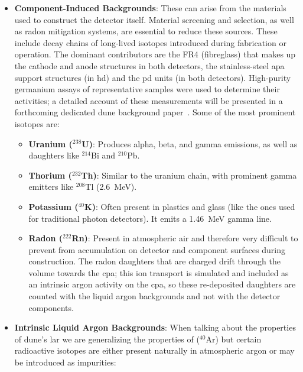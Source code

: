\begin{itemize}
  \item \textbf{Component-Induced Backgrounds}: These can arise from the materials used to construct the detector itself. Material screening and selection, as well as radon mitigation systems, are essential to reduce these sources. These include decay chains of long-lived isotopes introduced during fabrication or operation. The dominant contributors are the FR4 (fibreglass) that makes up the cathode and anode structures in both detectors, the stainless-steel \gls{apa} support structures (in \gls{hd}) and the \gls{pd} units (in both detectors). High-purity germanium assays of representative samples were used to determine their activities; a detailed account of these measurements will be presented in a forthcoming dedicated \gls{dune} background paper~\cite{DUNE:2026background}. Some of the most prominent isotopes are:

  \begin{itemize}
    \item \textbf{Uranium (\(^{238}\)U)}: Produces alpha, beta, and gamma emissions, as well as daughters like \(^{214}\)Bi and \(^{210}\)Pb.
    \item \textbf{Thorium (\(^{232}\)Th)}: Similar to the uranium chain, with prominent gamma emitters like \(^{208}\)Tl (\SI{2.6}{\mega\electronvolt}).
    \item \textbf{Potassium (\(^{40}\)K)}: Often present in plastics and glass (like the ones used for traditional photon detectors). It emits a \SI{1.46}{\mega\electronvolt} gamma line.
    \item \textbf{Radon (\(^{222}\)Rn)}: Present in atmospheric air and therefore very difficult to prevent from accumulation on detector and component surfaces during construction. The radon daughters that are charged drift through the volume towards the \gls{cpa}; this ion transport is simulated and included as an intrinsic argon activity on the \gls{cpa}, so these re-deposited daughters are counted with the liquid argon backgrounds and not with the detector components.
  \end{itemize}

  \item \textbf{Intrinsic Liquid Argon Backgrounds}: When talking about the properties of \gls{dune}'s \gls{lar} we are generalizing the properties of (\(^{40}\)Ar) but certain radioactive isotopes are either present naturally in atmospheric argon or may be introduced as impurities:


\end{itemize}
